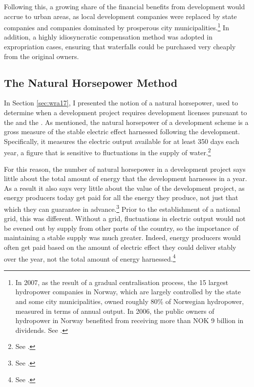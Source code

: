 Following this, a growing share of the financial benefits from development would accrue to urban areas, as local development companies were replaced by state companies and companies dominated by prosperous city municipalities.\footnote{In 2007, as the result of a gradual centralisation process, the 15 largest hydropower companies in Norway, which are largely controlled by the state and some city municipalities, owned roughly 80\% of Norwegian hydropower, measured in terms of annual output. In 2006, the public owners of hydropower in Norway benefited from receiving more than NOK 9 billion in dividends. See \cite[28]{otprp61}.} In addition, a highly idiosyncratic compensation method was adopted in expropriation cases, ensuring that waterfalls could be purchased very cheaply from the original owners.

\subsection{The Natural Horsepower Method}\label{sec:nathp}

In Section \ref{sec:wra17}, I presented the notion of a natural horsepower, used to determine when a development project requires development licenses pursuant to the \cite{wra17} and the \cite{ica17}. As mentioned, the natural horsepower of a development scheme is a gross measure of the stable electric effect harnessed following the development. Specifically, it measures the electric output available for at least 350 days each year, a figure that is sensitive to fluctuations in the supply of water.\footnote{See \cite{sofienlund07}.} 


For this reason, the number of natural horsepower in a development project says little about the total amount of energy that the development harnesses in a year. As a result it also says very little about the value of the development project, as energy producers today get paid for all the energy they produce, not just that which they can guarantee in advance.\footnote{See \cite[83-84]{uleberg08}.} Prior to the establishment of a national grid, this was different. Without a grid, fluctuations in electric output would not be evened out by supply from other parts of the country, so the importance of maintaining a stable supply was much greater. Indeed, energy producers would often get paid based on the amount of electric effect they could deliver stably over the year, not the total amount of energy harnessed.\footnote{See \cite[83]{uleberg08}.}

